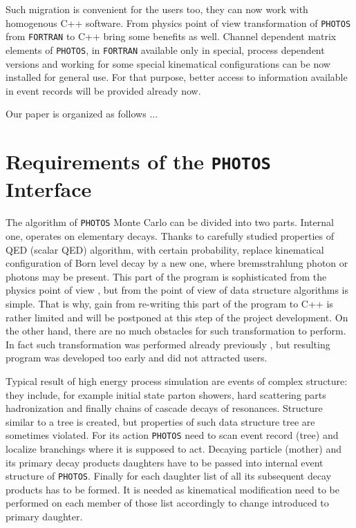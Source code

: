 \documentclass[]{Photos_interface_design}
\begin{document}
Such migration is convenient for the users too,  they can now work
with  homogenous C++ software. From physics point of view transformation 
of {\tt PHOTOS} 
from {\tt FORTRAN} to C++  bring some benefits as well.
Channel dependent matrix elements of {\tt PHOTOS}, in {\tt FORTRAN} available only 
in special, process dependent versions and working for some special
kinematical configurations
can be now installed for general use.
For that purpose, better access to information available in event records
will be provided already now.



Our paper is organized as follows ...



\section{Requirements of the {\tt PHOTOS} Interface}
The algorithm of {\tt PHOTOS} Monte Carlo can be divided into two parts.
Internal one, operates on elementary decays. Thanks to carefully 
studied properties of 
QED (scalar QED) algorithm, with certain probability, 
replace  kinematical configuration of Born level decay by a new one, 
where bremsstrahlung photon or photons
may be present. This part of the program is sophisticated from the physics 
point of view \cite{Nanava:2006vv,},
but from the point of view of data structure algorithms is simple.
That is why, gain from re-writing this part of the program to C++ is rather
limited and will be postponed at this step of the project development.
On the other hand, there are no much obstacles for such transformation to 
perform. In fact such transformation was performed already
previously \cite{photosplus}, but resulting program was developed too early 
and did not attracted users.

Typical result of high energy process simulation are events of complex structure:
they include, for example initial state parton showers, hard scattering parts 
hadronization and finally chains of cascade decays of resonances. 
Structure similar to a tree is created, but properties of such data structure
tree are sometimes violated.
For its action {\tt PHOTOS} need to scan event record (tree) 
and localize branchings where
it is supposed to act. Decaying particle (mother) and its primary decay products
daughters have to be passed into internal event structure of {\tt PHOTOS}. 
Finally for each daughter list of all its subsequent decay products has to be 
formed. It is needed as kinematical modification need to be performed on each 
member of those list accordingly to change introduced to primary daughter.
\end{document}
